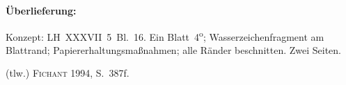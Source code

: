 %  
%				
%
%
%
%
\frenchspacing
%
\begin{ledgroupsized}[r]{120mm}
\footnotesize
\pstart
\noindent\textbf{Überlieferung:}
\pend
\end{ledgroupsized}
%
\begin{ledgroupsized}[r]{114mm}
\footnotesize
\pstart \parindent -6mm
%
Konzept:
LH~XXXVII~5~Bl.~16.
Ein Blatt~4\textsuperscript{o};
Wasserzeichenfragment am Blattrand;
Papiererhaltungsmaßnahmen;
alle Ränder beschnitten.
Zwei Seiten.
\pend
\end{ledgroupsized}
%
\begin{ledgroupsized}[r]{114mm}
\footnotesize
\pstart
\parindent -6mm
%
(tlw.) \cite{01056}\textsc{Fichant} 1994, S.~387f.
\pend%
\end{ledgroupsized}
%
%
\vspace{5mm}
